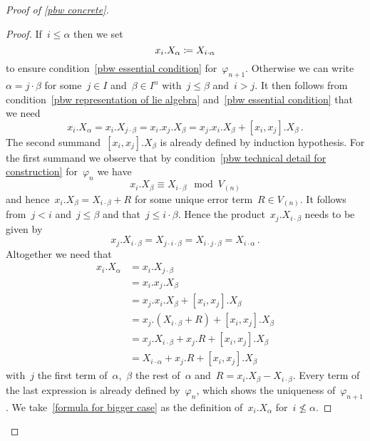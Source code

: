 \begin{proof}[Proof of \cref{pbw concrete}]
\begin{proof}
    If~$i \leq \alpha$ then we set
    \begin{equation}
      \label{formula for smaller case}
      x_i.X_\alpha
      \coloneqq
      X_{i \cdot \alpha}
    \end{equation}
    to ensure condition~\ref*{pbw essential condition} for~$\varphi_{n+1}$.
    Otherwise we can write~$\alpha = j \cdot \beta$ for some~$j \in I$ and~$\beta \in I^n$ with~$j \leq \beta$ and~$i > j$.
    It then follows from condition~\ref*{pbw representation of lie algebra} and~\ref*{pbw essential condition} that we need
    \[
      x_i.X_\alpha
      =
      x_i.X_{j \cdot \beta}
      =
      x_i.x_j.X_\beta
      =
      x_j.x_i.X_\beta + [x_i, x_j].X_\beta  \,.
    \]
    The second summand~$[x_i, x_j].X_\beta$ is already defined by induction hypothesis.
    For the first summand we observe that by condition~\ref*{pbw technical detail for construction} for~$\varphi_n$ we have
    \[
      x_i.X_\beta
      \equiv
      X_{i \cdot \beta}
      \mod
      V_{(n)}
    \]
    and hence~$x_i.X_\beta = X_{i \cdot \beta} + R$ for some unique error term~$R \in V_{(n)}$.
    It follows from~$j < i$ and~$j \leq \beta$ and that~$j \leq i \cdot \beta$.
    Hence the product~$x_j.X_{i \cdot \beta}$ needs to be given by
    \[
      x_j.X_{i \cdot \beta}
      =
      X_{j \cdot i \cdot \beta}
      =
      X_{i \cdot j \cdot \beta}
      =
      X_{i \cdot \alpha}  \,.
    \]
    Altogether we need that
    \begin{equation}
      \label{formula for bigger case}
      \begin{aligned}
        x_i.X_\alpha
        &=
        x_i.X_{j \cdot \beta}
        \\
        &=
        x_i.x_j.X_\beta
        \\
        &=
        x_j.x_i.X_\beta + [x_i, x_j].X_\beta
        \\
        &=
        x_j.(X_{i \cdot \beta} + R) + [x_i, x_j].X_\beta
        \\
        &=
        x_j.X_{i \cdot \beta} + x_j.R + [x_i, x_j].X_\beta
        \\
        &=
        X_{i \cdot \alpha} + x_j.R + [x_i, x_j].X_\beta
      \end{aligned}
    \end{equation}
    with~$j$ the first term of~$\alpha$,~$\beta$ the rest of~$\alpha$ and~$R = x_i.X_\beta - X_{i \cdot \beta}$.
    Every term of the last expression is already defined by~$\varphi_n$, which shows the uniqueness of~$\varphi_{n+1}$.
    We take~\eqref{formula for bigger case} as the definition of~$x_i.X_\alpha$ for~$i \nleq \alpha$.
    

\end{proof}
\end{proof}
